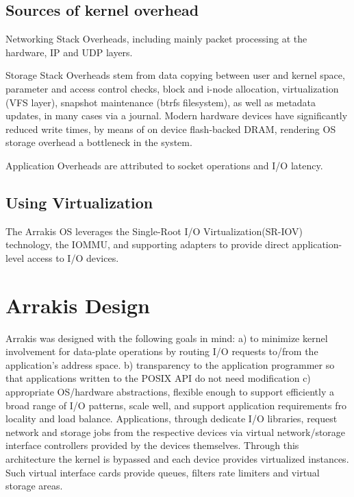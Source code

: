 \documentclass[letterpaper,twocolumn,10pt]{article}
\begin{document}
\subsection{Sources of kernel overhead} 

Networking Stack Overheads, including mainly packet processing at the hardware, IP and UDP layers. 

Storage Stack Overheads stem from data copying between user and kernel space, parameter and access control checks, block and i-node allocation, virtualization (VFS layer), snapshot maintenance (btrfs filesystem), as well as metadata updates, in many cases via a journal. Modern hardware devices have significantly reduced write times, by means of on device flash-backed DRAM, rendering OS storage overhead a bottleneck in the system.

Application Overheads are attributed to socket operations and I/O latency.

\subsection{Using Virtualization}
The Arrakis OS leverages the Single-Root I/O Virtualization(SR-IOV) technology, the IOMMU, and supporting adapters to provide direct application-level access to I/O devices.

\section{Arrakis Design}
Arrakis was designed with the following goals in mind:
a) to minimize kernel involvement for data-plate operations by routing I/O requests to/from the application's address space.
b) transparency to the application programmer so that applications written to the POSIX API do not need modification
c) appropriate OS/hardware abstractions, flexible enough to support efficiently a broad range of I/O patterns, scale well, and support application requirements fro locality and load balance.
Applications, through dedicate I/O libraries, request network and storage jobs from the respective devices via virtual network/storage interface controllers provided by the devices themselves. Through this architecture the kernel is bypassed and each device provides virtualized instances. Such virtual interface cards provide queues, filters rate limiters and virtual storage areas.
\end{document}
